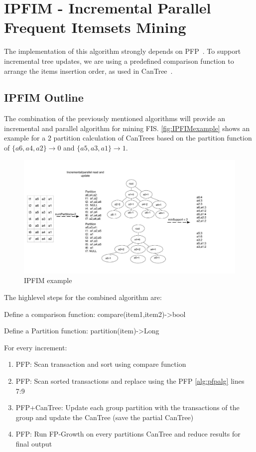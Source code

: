 \section{IPFIM - Incremental Parallel Frequent Itemsets Mining}
\label{sec:ipfim}
The implementation of this algorithm strongly depends on PFP~\cite{li2008pfp}. To support incremental tree updates, we are using a predefined comparison function to arrange the items insertion order, as used in CanTree~\cite{leung2005cantree}.

\subsection{IPFIM Outline}
The combination of the previously mentioned algorithms will provide an incremental and parallel algorithm for mining FIS.  \autoref{fig:IPFIMexample} shows an example for a 2 partition calculation of CanTrees based on the partition function of $\{a6,a4,a2\}\to 0$ and $\{a5,a3,a1\}\to 1$.
\begin{figure}
  \centering
  \includegraphics[width=\linewidth]{figures/IncrementalTreeMining1}
  \caption{IPFIM example}
  \label{fig:IPFIMexample}
\end{figure}

The highlevel steps for the combined algorithm are:
\begin{steps}
	\item Define a comparison function: compare(item1,item2)->bool
	\item Define a Partition function: partition(item)->Long
	\item For every increment:
		\begin{enumerate}
		\label{sec:ipfimAlg}
			\item PFP: Scan transaction and sort using compare function
			\item PFP: Scan sorted transactions and replace using the PFP \autoref{alg:pfpalg} lines 7:9
			\label{sec:ipfimpf}
			\item PFP+CanTree: Update each group partition with the transactions of the group and
			 update the CanTree (save the partial CanTree)
			\item PFP: Run FP-Growth on every partitions CanTree and reduce results for final output
		\end{enumerate}
\end{steps}


